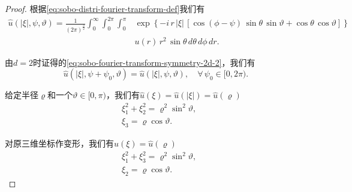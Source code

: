 \begin{proof}
根据\eqref{eq:sobo-distri-fourier-transform-def}我们有
\begin{equation*}
\begin{split}
  \widehat{u} \left( \left| \xi \right|, \psi, \vartheta \right)
  = \frac{1}{\left( 2 \pi \right)^{\frac{3}{2}}}
  \int_{0}^{\infty} \int_{0}^{2 \pi} \int_{0}^{\pi}
  & \exp \left\{
  - i \, r \, \left| \xi \right| \,
  \left[
  \cos (\phi - \psi) \, \sin \theta \, \sin \vartheta
  + \cos \theta \, \cos \vartheta
  \right]
  \right\} \, \\
  & u(r) \, r^2 \, \sin \theta \, d \theta \, d \phi \, dr.
\end{split}
\end{equation*}

由$d=2$时证得的\eqref{eq:sobo-fourier-transform-symmetry-2d-2}，我们有
\begin{equation*}
  \widehat{u} \left( \left| \xi \right|, \psi + \psi_0, \vartheta \right) = \widehat{u} \left( \left| \xi \right|, \psi , \vartheta \right), \quad \forall \, \psi_0 \in [0,2 \pi).
\end{equation*}

给定半径$\varrho$和一个$\vartheta \in [0,\pi)$，我们有$\widehat{u}(\xi) = \widehat{u} \left( \left| \xi \right| \right) = \widehat{u}(\varrho)$
\begin{equation*}
  \begin{split}
  &\xi_1^2 + \xi_2^2 = \varrho^2 \sin^2 \vartheta,\\
  &\xi_3 = \varrho \cos \vartheta.
  \end{split}
\end{equation*}

对原三维坐标作变形，我们有$\widehat{u}(\xi) = \widehat{u}(\varrho)$
\begin{equation*}
  \begin{split}
    & \xi_1^2 + \xi_3^2 = \varrho^2 \sin^2 \vartheta, \\
    & \xi_2 = \varrho \cos \vartheta.
  \end{split}
\end{equation*}
\end{proof}

